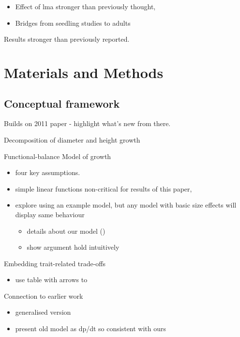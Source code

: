 \documentclass[12pt, a4paper]{article}
\begin{document}
\begin{itemize}
\itemsep1pt\parskip0pt
\item
  Effect of lma stronger than previously thought,
\item
  Bridges from seedling studies to adults
\end{itemize}

Results stronger than previously reported.

\section*{Materials and Methods}\label{materials-and-methods}

\subsection*{Conceptual framework}\label{conceptual-framework}

Builds on 2011 paper - highlight what's new from there.

Decomposition of diameter and height growth

Functional-balance Model of growth

\begin{itemize}
\itemsep1pt\parskip0pt
\item
  four key assumptions.
\item
  simple linear functions non-critical for results of this paper,
\item
  explore using an example model, but any model with basic size effects
  will display same behaviour

  \begin{itemize}
  \itemsep1pt\parskip0pt
  \item
    details about our model ()
  \item
    show argument hold intuitively
  \end{itemize}
\end{itemize}

Embedding trait-related trade-offs

\begin{itemize}
\itemsep1pt\parskip0pt
\item
  use table with arrows to
\end{itemize}

Connection to earlier work

\begin{itemize}
\itemsep1pt\parskip0pt
\item
  generalised version
\item
  present old model as dp/dt so consistent with ours
\end{itemize}
\end{document}
